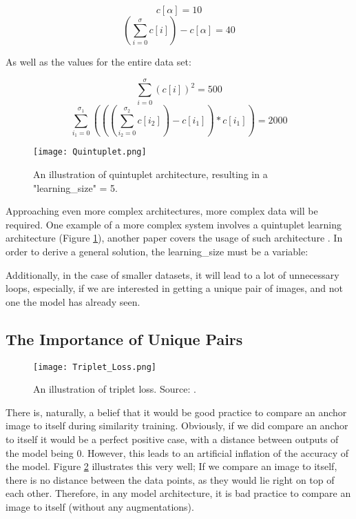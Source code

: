 \documentclass[
	letterpaper, %
	10pt, %
	unnumberedsections, %
	twoside, %
]{LTJournalArticle}
\begin{document}
\[ c[\alpha] = 10 \]
\[ (\sum_{i = 0}^\sigma c[i])- c[\alpha] =  40\]

As well as the values for the entire data set:

\[ \sum_{i = 0}^\sigma (c[i])^2 = 500 \]
\[ \sum_{i_1 = 0}^{\sigma_1}(((\sum_{i_2 = 0}^{\sigma_2} c[i_2]) - c[i_1]) * c[i_1]) = 2000 \]


\begin{figure} %
	\texttt{[image: Quintuplet.png]}
	\caption{An illustration of quintuplet architecture, resulting in a "learning\_size" = 5.}
	\label{fig:quintuplet}
\end{figure}

Approaching even more complex architectures, more complex data will be required. One example of a more complex system involves a quintuplet learning architecture (Figure \ref{fig:quintuplet}), another paper covers the usage of such architecture \autocite{zhai_huang_cheng_zhan_li_liu}. In order to derive a general solution, the learning\_size must be a variable:

Additionally, in the case of smaller datasets, it will lead to a lot of unnecessary loops, especially, if we are interested in getting a unique pair of images, and not one the model has already seen.


\subsection{The Importance of Unique Pairs}

\begin{figure} %
	\texttt{[image: Triplet\_Loss.png]}
	\caption{An illustration of triplet loss. Source: \autocite{tripletsemihardloss}.}
	\label{fig:tripletsemihardloss}
\end{figure}

There is, naturally, a belief that it would be good practice to compare an anchor image to itself during similarity training. Obviously, if we did compare an anchor to itself it would be a perfect positive case, with a distance between outputs of the model being 0.
However, this leads to an artificial inflation of the accuracy of the model. Figure \ref{fig:tripletsemihardloss} illustrates this very well; If we compare an image to itself, there is no distance between the data points, as they would lie right on top of each other.
Therefore, in any model architecture, it is bad practice to compare an image to itself (without any augmentations).
\end{document}
